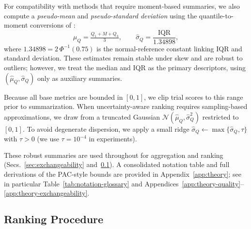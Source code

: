 For compatibility with methods that require moment-based summaries, we also
compute a \emph{pseudo-mean} and \emph{pseudo-standard deviation} using the
quantile-to-moment conversions of \citet{wan2016estimatingsamplemeanstandard}:
\[
\hat{\mu}_Q=\tfrac{Q_1+M+Q_3}{3},
\qquad
\hat{\sigma}_Q=\frac{\mathrm{IQR}}{1.34898},
\]
where $1.34898 = 2\,\Phi^{-1}(0.75)$ is the normal-reference constant linking
IQR and standard deviation. These estimates remain stable under skew and are
robust to outliers; however, we treat the median and IQR as the primary
descriptors, using $(\hat{\mu}_Q,\hat{\sigma}_Q)$ only as auxiliary summaries.

Because all base metrics are bounded in $[0,1]$, we clip trial scores to this
range prior to summarization. When uncertainty-aware ranking requires
sampling-based approximations, we draw from a truncated Gaussian
$\mathcal{N}(\hat{\mu}_Q,\hat{\sigma}_Q^2)$ restricted to $[0,1]$. To avoid
degenerate dispersion, we apply a small ridge
$\hat{\sigma}_Q \leftarrow \max\{\hat{\sigma}_Q,\tau\}$ with $\tau>0$
(we use $\tau=10^{-4}$ in experiments).

These robust summaries are used throughout for aggregation and ranking
(Secs.~\ref{sec:exchangeability} and~\ref{sec:ranking-across-metrics}).
A consolidated notation table and full derivations of the PAC-style bounds
are provided in Appendix~\ref{app:theory}; see in particular
Table~\ref{tab:notation-glossary} and
Appendices~\ref{app:theory-quality}--\ref{app:theory-exchangeability}.
\subsection{Ranking Procedure}
\label{sec:ranking-across-metrics}

